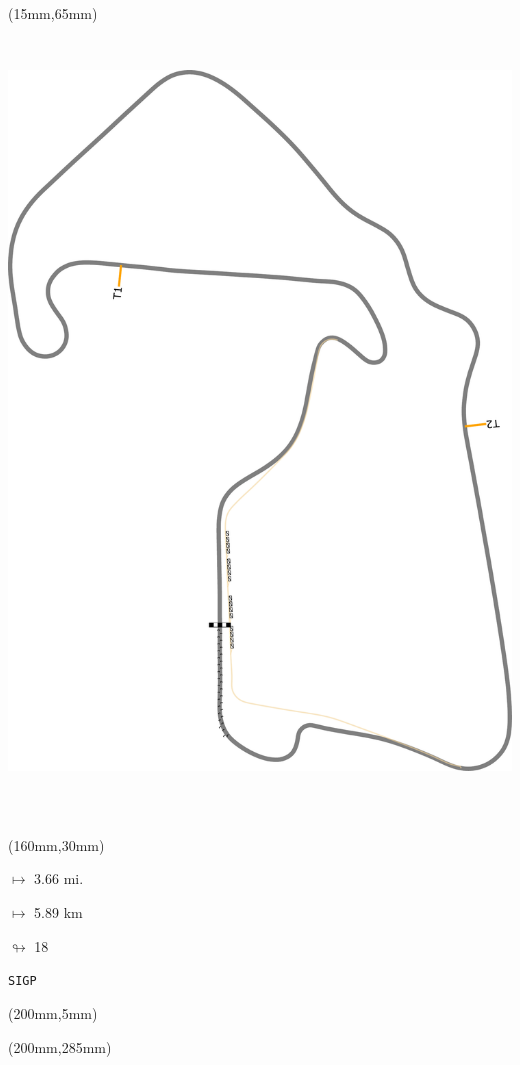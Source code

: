 \begin{textblock*}{185mm}(15mm,65mm)%
\centering
\mbox{\includegraphics[width=185mm,height=210mm,keepaspectratio]{PT/SIGP.pdf}}
\end{textblock*}
\begin{textblock*}{40mm}(160mm,30mm)%
\Large
\par$\mapsto$ 3.66 mi.
\par$\mapsto$ 5.89 km
\par$\looparrowright$ 18
\par\hfill\tiny\tt SIGP\\
\end{textblock*}
\begin{textblock*}{20mm}(200mm,5mm)%
\fbox{\thepage}
\label{SIGP}
\end{textblock*}
\begin{textblock*}{20mm}(200mm,285mm)%
\fbox{\thepage}
\end{textblock*}

